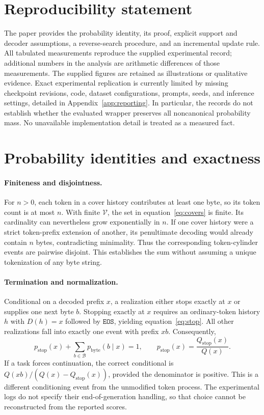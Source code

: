 \documentclass{article}
\newcommand{\bytes}{\mathcal{B}}
\newcommand{\vocab}{\mathcal{V}}
\newcommand{\eos}{\mathtt{EOS}}
\newcommand{\dec}{D}
\begin{document}
\section*{Reproducibility statement}
The paper provides the probability identity, its proof, explicit support and decoder assumptions, a reverse-search procedure, and an incremental update rule. All tabulated measurements reproduce the supplied experimental record; additional numbers in the analysis are arithmetic differences of those measurements. The supplied figures are retained as illustrations or qualitative evidence. Exact experimental replication is currently limited by missing checkpoint revisions, code, dataset configurations, prompts, seeds, and inference settings, detailed in Appendix~\ref{app:reporting}. In particular, the records do not establish whether the evaluated wrapper preserves all noncanonical probability mass. No unavailable implementation detail is treated as a measured fact.




\clearpage
\appendix
\section{Probability identities and exactness}
\label{app:proof}
\paragraph{Finiteness and disjointness.}
For $n>0$, each token in a cover history contributes at least one byte, so its token count is at most $n$. With finite $\vocab$, the set in equation~\ref{eq:covers} is finite. Its cardinality can nevertheless grow exponentially in $n$. If one cover history were a strict token-prefix extension of another, its penultimate decoding would already contain $n$ bytes, contradicting minimality. Thus the corresponding token-cylinder events are pairwise disjoint. This establishes the sum without assuming a unique tokenization of any byte string.

\paragraph{Termination and normalization.}
Conditional on a decoded prefix $x$, a realization either stops exactly at $x$ or supplies one next byte $b$. Stopping exactly at $x$ requires an ordinary-token history $h$ with $\dec(h)=x$ followed by $\eos$, yielding equation~\ref{eq:stop}. All other realizations fall into exactly one event with prefix $xb$. Consequently,
\begin{equation}
 p_{\mathrm{stop}}(x)+\sum_{b\in\bytes}p_{\mathrm{byte}}(b\mid x)=1,
 \qquad p_{\mathrm{stop}}(x)=\frac{Q_{\mathrm{stop}}(x)}{Q(x)}.
\end{equation}
If a task forces continuation, the correct conditional is
$Q(xb)/(Q(x)-Q_{\mathrm{stop}}(x))$, provided the denominator is positive. This is a different conditioning event from the unmodified token process. The experimental logs do not specify their end-of-generation handling, so that choice cannot be reconstructed from the reported scores.
\end{document}
